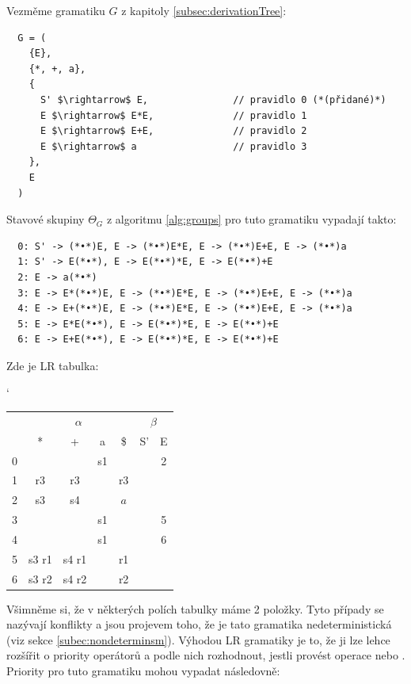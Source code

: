 \begin{exmp} Vezměme gramatiku $G$ z kapitoly \ref{subsec:derivationTree}:


\begin{lstlisting}
  G = (
    {E},
    {*, +, a},
    {
      S' $\rightarrow$ E,               // pravidlo 0 (*(přidané)*)
      E $\rightarrow$ E*E,              // pravidlo 1
      E $\rightarrow$ E+E,              // pravidlo 2
      E $\rightarrow$ a                 // pravidlo 3
    },
    E
  )
\end{lstlisting}

\noindent
Stavové skupiny $\Theta_G$ z algoritmu \ref{alg:groups} pro tuto gramatiku vypadají takto:
\begin{lstlisting}
  0: S' -> (*•*)E, E -> (*•*)E*E, E -> (*•*)E+E, E -> (*•*)a
  1: S' -> E(*•*), E -> E(*•*)*E, E -> E(*•*)+E
  2: E -> a(*•*)
  3: E -> E*(*•*)E, E -> (*•*)E*E, E -> (*•*)E+E, E -> (*•*)a
  4: E -> E+(*•*)E, E -> (*•*)E*E, E -> (*•*)E+E, E -> (*•*)a
  5: E -> E*E(*•*), E -> E(*•*)*E, E -> E(*•*)+E
  6: E -> E+E(*•*), E -> E(*•*)*E, E -> E(*•*)+E
\end{lstlisting}

\noindent
Zde je LR tabulka:

\begin{table}[H]
  \catcode`
  \centering
  \begin{tabular}{| c || c | c | c | c || c | c |}
    \hline
    \multirow{2}{*}{} & \multicolumn{4}{c||}{$\alpha$}& \multicolumn{2}{c|}{$\beta$} \\
    \cline{2-7}
      & * & + & a & \$& S'& E \\
    \hhline{|=||=|=|=|=||=|=|}
    0 &   &   & s1 &   &   & 2 \\
    \hline
    1 & r3 & r3 &   & r3 &   &   \\
    \hline
    2 & s3 & s4 &   & $a$ &   &   \\
    \hline
    3 &   &   & s1 &   &   & 5 \\
    \hline
    4 &   &   & s1 &   &   & 6 \\
    \hline
    5 & s3 r1 &  s4 r1 & & r1 &   & \\
    \hline
    6 & s3 r2 &  s4 r2 & & r2 &   & \\
    \hline
  \end{tabular}
\end{table}

Všimněme si, že v některých polích tabulky máme 2 položky. Tyto případy
se nazývají  konflikty a jsou projevem toho, že je tato
gramatika nedeterministická (viz sekce \ref{subec:nondeterminsm}).
Výhodou LR gramatiky je to, že ji lze lehce rozšířit o priority operátorů
a podle nich rozhodnout, jestli provést operace  nebo .
Priority pro tuto gramatiku mohou vypadat následovně:


\end{exmp}
